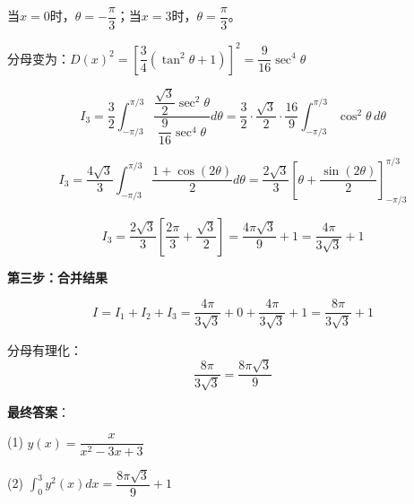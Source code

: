\documentclass[standard]{ExBook}
\begin{document}
\begin{qitems}
\begin{bbox}
\begin{solution}
            当$x=0$时，$\theta = -\dfrac{\pi}{3}$；当$x=3$时，$\theta = \dfrac{\pi}{3}$。
            
            分母变为：$D(x)^2 = \left[\dfrac{3}{4}(\tan^2\theta + 1)\right]^2 = \dfrac{9}{16}\sec^4\theta$
            
            $$I_3 = \frac{3}{2}\int_{-\pi/3}^{\pi/3} \frac{\dfrac{\sqrt{3}}{2}\sec^2\theta}{\dfrac{9}{16}\sec^4\theta} d\theta = \frac{3}{2} \cdot \frac{\sqrt{3}}{2} \cdot \frac{16}{9}\int_{-\pi/3}^{\pi/3} \cos^2\theta\, d\theta$$
            
            $$I_3 = \frac{4\sqrt{3}}{3}\int_{-\pi/3}^{\pi/3} \frac{1+\cos(2\theta)}{2} d\theta = \frac{2\sqrt{3}}{3}\left[\theta + \frac{\sin(2\theta)}{2}\right]_{-\pi/3}^{\pi/3}$$
            
            $$I_3 = \frac{2\sqrt{3}}{3}\left[\frac{2\pi}{3} + \frac{\sqrt{3}}{2}\right] = \frac{4\pi\sqrt{3}}{9} + 1 = \frac{4\pi}{3\sqrt{3}} + 1$$
            
            \textbf{第三步：合并结果}
            
            $$I = I_1 + I_2 + I_3 = \frac{4\pi}{3\sqrt{3}} + 0 + \frac{4\pi}{3\sqrt{3}} + 1 = \frac{8\pi}{3\sqrt{3}} + 1$$
            
            分母有理化：
            $$\frac{8\pi}{3\sqrt{3}} = \frac{8\pi\sqrt{3}}{9}$$
            
            \textbf{最终答案}：
            
            (1) $y(x) = \dfrac{x}{x^2 - 3x + 3}$
            
            (2) $\int_0^3 y^2(x)dx = \dfrac{8\pi\sqrt{3}}{9} + 1$
        \end{solution}
    \end{bbox}

\end{qitems}
\end{document}
